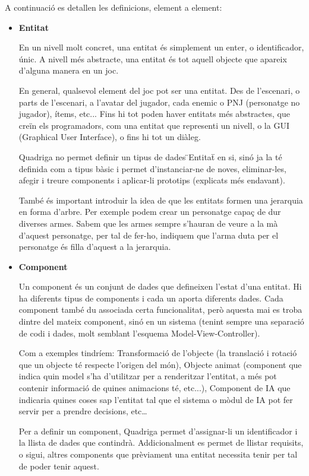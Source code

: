   A continuació es detallen les definicions, element a element:
  
  \begin{itemize}
    \item{\bf Entitat}

      En un nivell molt concret, una entitat és simplement un enter, o identificador, únic. A nivell més abstracte, una entitat és tot aquell objecte que apareix d'alguna manera en un joc.
      
      En general, qualsevol element del joc pot ser una entitat. Des de l'escenari, o parts de l'escenari, a l'avatar del jugador, cada enemic o PNJ (personatge no jugador), ítems, etc... Fins hi tot poden haver entitats més abstractes, que creïn els programadors, com una entitat que representi un nivell, o la GUI (Graphical User Interface), o fins hi tot un diàleg.

      Quadriga no permet definir un tipus de dades \"{}Entitat\"{} en si, sinó ja la té definida com a tipus bàsic i permet d'instanciar-ne de noves, eliminar-les, afegir i treure components i aplicar-li prototips (explicats més endavant).
      
      També és important introduir la idea de que les entitats formen una jerarquia en forma d'arbre. Per exemple podem crear un personatge capaç de dur diverses armes. Sabem que les armes sempre s'hauran de veure a la mà d'aquest personatge, per tal de fer-ho, indiquem que l'arma duta per el personatge és filla d'aquest a la jerarquia.
      
    \item{\bf Component}

      Un component és un conjunt de dades que defineixen l'estat d'una entitat. Hi ha diferents tipus de components i cada un aporta diferents dades. Cada component també du associada certa funcionalitat, però aquesta mai es troba dintre del mateix component, sinó en un sistema (tenint sempre una separació de codi i dades, molt semblant l'esquema Model-View-Controller).
      
      Com a exemples tindríem: Transformació de l'objecte (la translació i rotació que un objecte té respecte l'origen del món), Objecte animat (component que indica quin model s'ha d'utilitzar per a renderitzar l'entitat, a més pot contenir informació de quines animacions té, etc...), Component de IA que indicaria quines coses sap l'entitat tal que el sistema o mòdul de IA pot fer servir per a prendre decisions, etc\ldots
      
      Per a definir un component, Quadriga permet d'assignar-li un identificador i la llista de dades que contindrà. Addicionalment es permet de llistar requisits, o sigui, altres components que prèviament una entitat necessita tenir per tal de poder tenir aquest.
      

\end{itemize}
